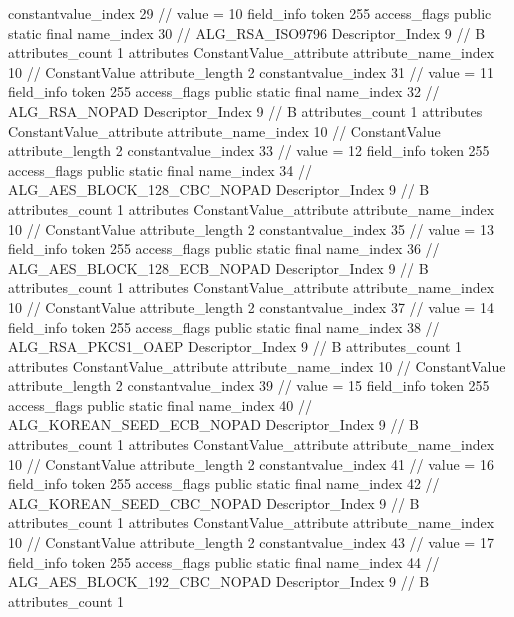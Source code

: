 {{{{{{{					constantvalue_index	29		// value = 10
				}
				}
			}
			field_info {
				token	255
				access_flags	public static final
				name_index	30		// ALG_RSA_ISO9796
				Descriptor_Index	9		// B
				attributes_count	1
				attributes {
				ConstantValue_attribute {
					attribute_name_index	10		// ConstantValue
					attribute_length	2
					constantvalue_index	31		// value = 11
				}
				}
			}
			field_info {
				token	255
				access_flags	public static final
				name_index	32		// ALG_RSA_NOPAD
				Descriptor_Index	9		// B
				attributes_count	1
				attributes {
				ConstantValue_attribute {
					attribute_name_index	10		// ConstantValue
					attribute_length	2
					constantvalue_index	33		// value = 12
				}
				}
			}
			field_info {
				token	255
				access_flags	public static final
				name_index	34		// ALG_AES_BLOCK_128_CBC_NOPAD
				Descriptor_Index	9		// B
				attributes_count	1
				attributes {
				ConstantValue_attribute {
					attribute_name_index	10		// ConstantValue
					attribute_length	2
					constantvalue_index	35		// value = 13
				}
				}
			}
			field_info {
				token	255
				access_flags	public static final
				name_index	36		// ALG_AES_BLOCK_128_ECB_NOPAD
				Descriptor_Index	9		// B
				attributes_count	1
				attributes {
				ConstantValue_attribute {
					attribute_name_index	10		// ConstantValue
					attribute_length	2
					constantvalue_index	37		// value = 14
				}
				}
			}
			field_info {
				token	255
				access_flags	public static final
				name_index	38		// ALG_RSA_PKCS1_OAEP
				Descriptor_Index	9		// B
				attributes_count	1
				attributes {
				ConstantValue_attribute {
					attribute_name_index	10		// ConstantValue
					attribute_length	2
					constantvalue_index	39		// value = 15
				}
				}
			}
			field_info {
				token	255
				access_flags	public static final
				name_index	40		// ALG_KOREAN_SEED_ECB_NOPAD
				Descriptor_Index	9		// B
				attributes_count	1
				attributes {
				ConstantValue_attribute {
					attribute_name_index	10		// ConstantValue
					attribute_length	2
					constantvalue_index	41		// value = 16
				}
				}
			}
			field_info {
				token	255
				access_flags	public static final
				name_index	42		// ALG_KOREAN_SEED_CBC_NOPAD
				Descriptor_Index	9		// B
				attributes_count	1
				attributes {
				ConstantValue_attribute {
					attribute_name_index	10		// ConstantValue
					attribute_length	2
					constantvalue_index	43		// value = 17
				}
				}
			}
			field_info {
				token	255
				access_flags	public static final
				name_index	44		// ALG_AES_BLOCK_192_CBC_NOPAD
				Descriptor_Index	9		// B
				attributes_count	1
}}}}}
